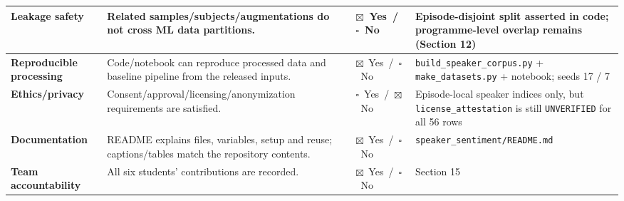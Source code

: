 \documentclass[11pt,a4paper]{article}
\newcommand{\thd}[1]{\textbf{\sffamily\small #1}}          %
\begin{document}
\begin{longtable}{|L{2.9cm}|L{6.4cm}|L{2.3cm}|L{3.4cm}|}
\thd{Leakage safety} & Related samples/subjects/augmentations do not cross ML data partitions. & $\boxtimes$~Yes~/~$\square$~No & Episode-disjoint split asserted in code; \textbf{programme-level overlap remains} (Section 12) \\ \hline
\thd{Reproducible processing} & Code/notebook can reproduce processed data and baseline pipeline from the released inputs. & $\boxtimes$~Yes~/~$\square$~No & \texttt{build\_speaker\_corpus.py} + \texttt{make\_datasets.py} + notebook; seeds 17 / 7 \\ \hline
\thd{Ethics/privacy} & Consent/approval/licensing/anonymization requirements are satisfied. & $\square$~Yes~/~$\boxtimes$~No & Episode-local speaker indices only, but \texttt{license\_attestation} is still \texttt{UNVERIFIED} for all 56 rows \\ \hline
\thd{Documentation}  & README explains files, variables, setup and reuse; captions/tables match the repository contents. & $\boxtimes$~Yes~/~$\square$~No & \texttt{speaker\_sentiment/}\newline\texttt{README.md} \\ \hline
\thd{Team accountability} & All six students' contributions are recorded. & $\boxtimes$~Yes~/~$\square$~No & Section 15 \\ \hline
\end{longtable}
\addtocounter{table}{-1}
\endgroup
\end{document}
